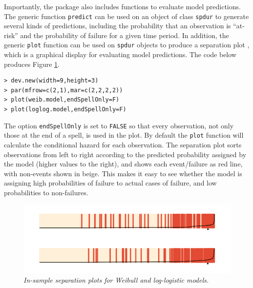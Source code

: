 \documentclass[letter]{article}
\begin{document}
Importantly, the package also includes functions to evaluate model predictions. The generic function \texttt{predict} can be used on an object of class \texttt{spdur} to generate several kinds of predictions, including the probability that an observation is ``at-risk'' and the probability of failure for a given time period. In addition, the generic \texttt{plot} function can be used on \texttt{spdur} objects to produce a separation plot \citep{greenhill2011separation}, which is a graphical display for evaluating model predictions. The code below produces Figure \ref{insamp}.
\small
\begin{verbatim}
> dev.new(width=9,height=3)
> par(mfrow=c(2,1),mar=c(2,2,2,2))
> plot(weib.model,endSpellOnly=F)
> plot(loglog.model,endSpellOnly=F)
\end{verbatim}
\normalsize
The option \texttt{endSpellOnly} is set to \texttt{FALSE} so that every observation, not only those at the end of a spell, is used in the plot. By default the \texttt{plot} function will calculate the conditional hazard for each observation. The separation plot sorts observations from left to right according to the predicted probability assigned by the model (higher values to the right), and shows each event/failure as red line, with non-events shown in beige. This makes it easy to see whether the model is assigning high probabilities of failure to actual cases of failure, and low probabilities to non-failures. 
\begin{figure}[htbp!]
\centering
\includegraphics[width=5in]{in-sample.pdf}
\caption{{\em In-sample separation plots for Weibull and log-logistic models.}} \label{insamp}
\end{figure}
\end{document}
